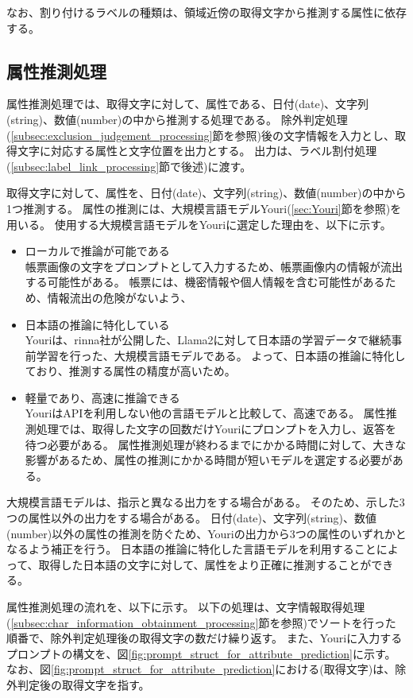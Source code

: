 なお、割り付けるラベルの種類は、領域近傍の取得文字から推測する属性に依存する。

\subsection{属性推測処理}\label{subsec:att_prediction_processing}
属性推測処理では、取得文字に対して、属性である、日付(date)、文字列(string)、数値(number)の中から推測する処理である。
除外判定処理(\ref{subsec:exclusion_judgement_processing}節を参照)後の文字情報を入力とし、取得文字に対応する属性と文字位置を出力とする。
出力は、ラベル割付処理(\ref{subsec:label_link_processing}節で後述)に渡す。

取得文字に対して、属性を、日付(date)、文字列(string)、数値(number)の中から1つ推測する。
属性の推測には、大規模言語モデルYouri(\ref{sec:Youri}節を参照)を用いる。
使用する大規模言語モデルをYouriに選定した理由を、以下に示す。

\begin{itemize}
    \item ローカルで推論が可能である\\
        帳票画像の文字をプロンプトとして入力するため、帳票画像内の情報が流出する可能性がある。
        帳票には、機密情報や個人情報を含む可能性があるため、情報流出の危険がないよう、
    \item 日本語の推論に特化している\\
        Youriは、rinna社が公開した、Llama2に対して日本語の学習データで継続事前学習を行った、大規模言語モデルである。
        よって、日本語の推論に特化しており、推測する属性の精度が高いため。
    \item 軽量であり、高速に推論できる\\
        YouriはAPIを利用しない他の言語モデルと比較して、高速である。
        属性推測処理では、取得した文字の回数だけYouriにプロンプトを入力し、返答を待つ必要がある。
        属性推測処理が終わるまでにかかる時間に対して、大きな影響があるため、属性の推測にかかる時間が短いモデルを選定する必要がある。
\end{itemize}

大規模言語モデルは、指示と異なる出力をする場合がある。
そのため、示した3つの属性以外の出力をする場合がある。
日付(date)、文字列(string)、数値(number)以外の属性の推測を防ぐため、Youriの出力から3つの属性のいずれかとなるよう補正を行う。
日本語の推論に特化した言語モデルを利用することによって、取得した日本語の文字に対して、属性をより正確に推測することができる。

属性推測処理の流れを、以下に示す。
以下の処理は、文字情報取得処理(\ref{subsec:char_information_obtainment_processing}節を参照)でソートを行った順番で、除外判定処理後の取得文字の数だけ繰り返す。
また、Youriに入力するプロンプトの構文を、図\ref{fig:prompt_struct_for_attribute_prediction}に示す。
なお、図\ref{fig:prompt_struct_for_attribute_prediction}における(取得文字)は、除外判定後の取得文字を指す。


